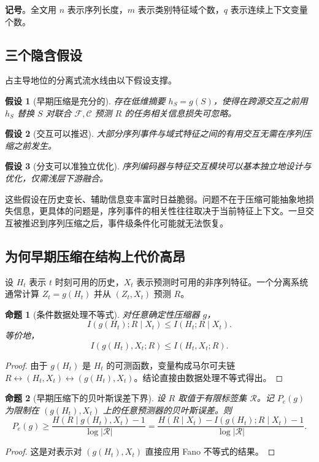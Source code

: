 \documentclass{article}
\newtheorem{assumption}{假设}
\newtheorem{proposition}{命题}
\begin{document}
\textbf{记号}。全文用 \(n\) 表示序列长度，\(m\) 表示类别特征域个数，\(q\) 表示连续上下文变量个数。

\subsection{三个隐含假设}

占主导地位的分离式流水线由以下假设支撑。

\begin{assumption}[早期压缩是充分的]
存在低维摘要 \(h_S = g(S)\)，使得在跨源交互之前用 \(h_S\) 替换 \(S\) 对联合 \(\mathcal{F},\mathcal{C}\) 预测 \(R\) 的任务相关信息损失可忽略。
\end{assumption}

\begin{assumption}[交互可以推迟]
大部分序列事件与域式特征之间的有用交互无需在序列压缩之前发生。
\end{assumption}

\begin{assumption}[分支可以准独立优化]
序列编码器与特征交互模块可以基本独立地设计与优化，仅需浅层下游融合。
\end{assumption}

这些假设在历史变长、辅助信息变丰富时日益脆弱。问题不在于压缩可能抽象地损失信息，更具体的问题是，序列事件的相关性往往取决于当前特征上下文。一旦交互被推迟到序列压缩之后，事件级条件化可能就无法恢复。

\subsection{为何早期压缩在结构上代价高昂}

设 \(H_t\) 表示 \(t\) 时刻可用的历史，\(X_t\) 表示预测时可用的非序列特征。一个分离系统通常计算 \(Z_t = g(H_t)\) 并从 \((Z_t, X_t)\) 预测 \(R\)。

\begin{proposition}[条件数据处理不等式]
对任意确定性压缩器 \(g\)，
\[
I(g(H_t);R\mid X_t) \leq I(H_t;R\mid X_t).
\]
等价地，
\[
I(g(H_t),X_t;R) \leq I(H_t,X_t;R).
\]
\end{proposition}
\begin{proof}
由于 \(g(H_t)\) 是 \(H_t\) 的可测函数，变量构成马尔可夫链 \(R \leftrightarrow (H_t,X_t) \leftrightarrow (g(H_t),X_t)\)。结论直接由数据处理不等式得出。
\end{proof}

\begin{proposition}[早期压缩下的贝叶斯误差下界]
设 \(R\) 取值于有限标签集 \(\mathcal{R}\)。记 \(P_e(g)\) 为限制在 \((g(H_t),X_t)\) 上的任意预测器的贝叶斯误差。则
\[
P_e(g) \ge \frac{H(R\mid g(H_t),X_t)-1}{\log|\mathcal{R}|}
     = \frac{H(R\mid X_t) - I(g(H_t);R\mid X_t) - 1}{\log|\mathcal{R}|}.
\]
\end{proposition}
\begin{proof}
这是对表示对 \((g(H_t),X_t)\) 直接应用 Fano 不等式的结果。
\end{proof}
\end{document}
